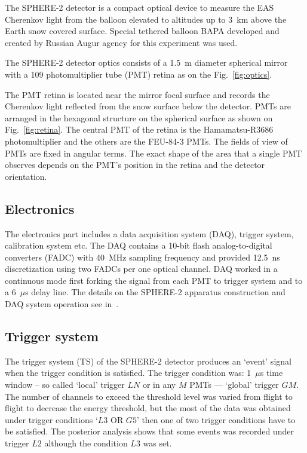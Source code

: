 \documentclass[final,5p,times,twocolumn]{elsarticle}
\begin{document}
The \mbox{SPHERE-2} detector is a compact optical device to measure the EAS Cherenkov light from the balloon elevated to altitudes up to 3~km above the Earth snow covered surface. Special tethered balloon BAPA developed and created by Russian Augur agency for this experiment was used.

The \mbox{SPHERE-2} detector optics consists of a 1.5~m diameter spherical mirror with a 109 photomultiplier tube (PMT) retina as on the Fig.~\ref{fig:optics}. 

The PMT retina is located near the mirror focal surface and records the Cherenkov light reflected from the snow surface below the detector. PMTs are arranged in the hexagonal structure on the spherical surface as shown on Fig.~\ref{fig:retina}. The central PMT of the retina is the Hamamatsu-R3686 photomultiplier and the others are the FEU-84-3 PMTs. The fields of view of PMTs are fixed in angular terms. The exact shape of the area that a single PMT observes depends on the PMT's position in the retina and the detector orientation.

\subsection{Electronics}

The electronics part includes a data acquisition system (DAQ), trigger system, calibration system etc. The DAQ contains a 10-bit flash analog-to-digital converters (FADC) with 40~MHz sampling frequency and provided 12.5~ns discretization using two \mbox{FADCs} per one optical channel. DAQ worked in a continuous mode first forking the signal from each PMT to trigger system and to a 6~$\mu$s delay line. The details on the \mbox{SPHERE-2} apparatus construction and DAQ system operation see in~\cite{ant15a}. 


\subsection{Trigger system}
The trigger system (TS) of the SPHERE-2 detector produces an `event' signal when the trigger condition is satisfied. The trigger condition was: 1~${\mu}$s time window -- so called `local' trigger $LN$ or in any $M$ PMTs --- `global' trigger $GM$. The number of channels to exceed the threshold level was varied from flight to flight to decrease the energy threshold, but the most of the data was obtained under trigger conditions `$L3$ OR $G5$' then one of two trigger conditions have to be satisfied. The posterior analysis shows that some events was recorded under trigger $L2$ although the condition $L3$ was set.
\end{document}
